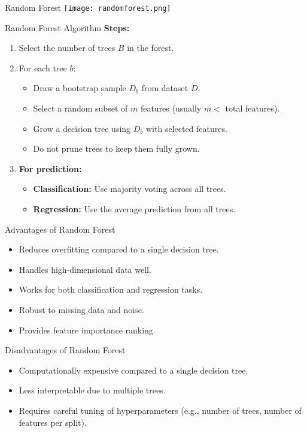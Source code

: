 \documentclass[serif, aspectratio=169]{beamer}
\begin{document}
\begin{frame}{Random Forest}
    \centering
    \texttt{[image: randomforest.png]}
\end{frame}

\begin{frame}{Random Forest Algorithm}
    \textbf{Steps:}
    \begin{enumerate}
        \item Select the number of trees \( B \) in the forest.
        \item For each tree \( b \):
        \begin{itemize}
            \item Draw a bootstrap sample \( D_b \) from dataset \( D \).
            \item Select a random subset of \( m \) features (usually \( m < \) total features).
            \item Grow a decision tree using \( D_b \) with selected features.
            \item Do not prune trees to keep them fully grown.
        \end{itemize}
        \item \textbf{For prediction:}
        \begin{itemize}
            \item \textbf{Classification:} Use majority voting across all trees.
            \item \textbf{Regression:} Use the average prediction from all trees.
        \end{itemize}
    \end{enumerate}
\end{frame}

\begin{frame}{Advantages of Random Forest}
    \begin{itemize}
        \item Reduces overfitting compared to a single decision tree.
        \item Handles high-dimensional data well.
        \item Works for both classification and regression tasks.
        \item Robust to missing data and noise.
        \item Provides feature importance ranking.
    \end{itemize}
\end{frame}

\begin{frame}{Disadvantages of Random Forest}
    \begin{itemize}
        \item Computationally expensive compared to a single decision tree.
        \item Less interpretable due to multiple trees.
        \item Requires careful tuning of hyperparameters (e.g., number of trees, number of features per split).
    \end{itemize}
\end{frame}
\end{document}
